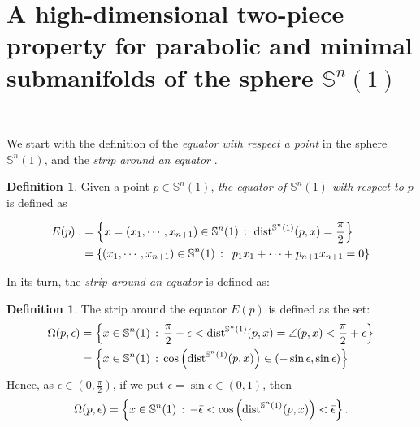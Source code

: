 \documentclass{amsart}
\theoremstyle{definition}
\newtheorem{definition}[theorem]{Definition}
\theoremstyle{remark}
\newcommand{\ese}{\mathbb{S}}
\begin{document}



\section{A high-dimensional two-piece property for parabolic and minimal submanifolds of the sphere $\mathbb{S}^n(1)$ }\


We start with the definition of the {\em equator with respect a point} in the sphere $\ese^n(1)$, and the {\em strip around an equator }.

\begin{definition}
Given a point $p \in \mathbb{S}^n(1)$, \emph{the equator of  $\mathbb{S}^n(1)$ with respect to $p$} is defined as 
   
  $$
    \begin{aligned}
E(p):&=\left\{x=(x_1,\cdots,x_{n+1})\in \mathbb{S}^n(1)\, :\,\,{\rm dist}^{\mathbb{S}^n(1)}(p,x)=\frac{\pi}{2} \right\}\\&=
\left\{(x_1,\cdots,x_{n+1})\in \mathbb{S}^n(1)\, : \,\,\, p_1x_1+\cdots+p_{n+1}x_{n+1}=0\right\}
\end{aligned}
    $$
    \end{definition}
    
    In its turn, the {\em strip around an equator } is defined as:
    
\begin{definition}
The strip around the equator $E(p)$ is defined as the set:
    $$
\begin{aligned}
\Omega(p,\epsilon)&=\left\lbrace x\in \mathbb{S}^{n}(1)\, : \, \frac{\pi}{2}-\epsilon<{\rm dist}^{\mathbb{S}^{n}(1)}(p,x)=\angle{(p,x)}<\frac{\pi}{2}+\epsilon\right\rbrace\\&=\left\lbrace x\in \mathbb{S}^{n}(1)\, : \,   \cos\left({\rm dist}^{\mathbb{S}^{n}(1)}(p,x)\right)\in ( -\sin\epsilon,\sin\epsilon) \right\rbrace
\end{aligned}
$$
Hence, as $\epsilon \in (0,\frac{\pi}{2})$, if we put $\bar \epsilon=\sin \epsilon \in (0,1)$, then
$$
\Omega(p,\epsilon) =\left\lbrace x\in \mathbb{S}^{n}(1)\, : \, -\bar \epsilon<\cos\left({\rm dist}^{\mathbb{S}^{n}(1)}(p,x)\right)<\bar \epsilon\right\rbrace.
$$
\end{definition}
\end{document}
